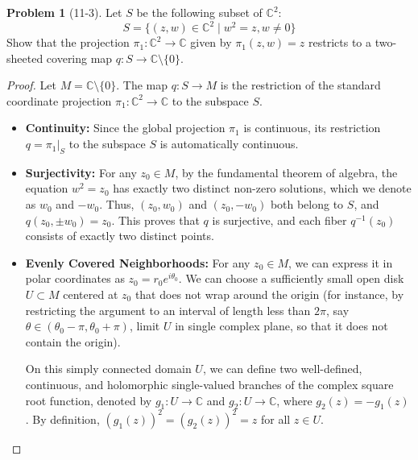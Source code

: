 \documentclass[11pt, a4paper]{article}
\theoremstyle{definition}
\newtheorem{prob}{Problem}
\newenvironment{problem}[1][]{\begin{prob}[#1]\normalfont}{\end{prob}\vspace{1.5em}}
\begin{document}



\begin{problem}[11-3]
Let $S$ be the following subset of $\mathbb{C}^2$:
$$ S = \{ (z,w) \in \mathbb{C}^2 \mid w^2 = z, w \neq 0 \} $$
Show that the projection $\pi_1: \mathbb{C}^2 \to \mathbb{C}$ given by 
$\pi_1(z,w) = z$ restricts to a two-sheeted covering map $q: S \to \mathbb{C} \setminus \{0\}$.

\begin{proof}
Let $M = \mathbb{C} \setminus \{0\}$. The map $q: S \to M$ is the restriction of the standard coordinate projection $\pi_1: \mathbb{C}^2 \to \mathbb{C}$ to the subspace $S$.

\begin{itemize}
    \item[$1^\circ$] \textbf{Continuity:} Since the global projection $\pi_1$ is continuous, its restriction 
    $q = \pi_1|_S$ to the subspace $S$ is automatically continuous.
    \item[$2^\circ$] \textbf{Surjectivity:} For any $z_0 \in M$, by the fundamental theorem of algebra, the 
    equation $w^2 = z_0$ has exactly two distinct non-zero solutions, which we denote as $w_0$ and $-w_0$. Thus, 
    $(z_0, w_0)$ and $(z_0, -w_0)$ both belong to $S$, and $q(z_0, \pm w_0) = z_0$. This proves that $q$ is 
    surjective, and each fiber $q^{-1}(z_0)$ consists of exactly two distinct points.
    
    \item[$3^\circ$] \textbf{Evenly Covered Neighborhoods:} For any $z_0 \in M$, we can express it in polar 
    coordinates as $z_0 = r_0 e^{i\theta_0}$. We can choose a sufficiently small open disk $U \subset M$ centered 
    at $z_0$ that does not wrap around the origin (for instance, by restricting the argument to an interval of 
    length less than $2\pi$, say $\theta \in (\theta_0 - \pi, \theta_0 + \pi)$, limit $U$ in single complex plane, 
    so that it does not contain the origin). 
    
    On this simply connected domain $U$, we can define two well-defined, continuous, and holomorphic single-valued 
    branches of the complex square root function, denoted by $g_1: U \to \mathbb{C}$ and $g_2: U \to \mathbb{C}$, 
    where $g_2(z) = -g_1(z)$. By definition, $(g_1(z))^2 = (g_2(z))^2 = z$ for all $z \in U$.
    

\end{itemize}
\end{proof}
\end{problem}
\end{document}
